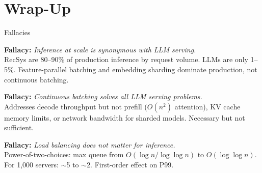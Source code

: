 \documentclass[aspectratio=169, 12pt]{beamer}
\begin{document}
\section{Wrap-Up}

\begin{frame}{Fallacies}

\footnotesize
\textbf{Fallacy:} \textit{Inference at scale is synonymous with LLM serving.}\\
{\scriptsize RecSys are 80--90\% of production inference by request volume. LLMs are only 1--5\%. Feature-parallel batching and embedding sharding dominate production, not continuous batching.}

\vspace{0.08cm}
\textbf{Fallacy:} \textit{Continuous batching solves all LLM serving problems.}\\
{\scriptsize Addresses decode throughput but not prefill ($O(n^2)$ attention), KV cache memory limits, or network bandwidth for sharded models. Necessary but not sufficient.}

\vspace{0.08cm}
\textbf{Fallacy:} \textit{Load balancing does not matter for inference.}\\
{\scriptsize Power-of-two-choices: max queue from $O(\log n / \log \log n)$ to $O(\log \log n)$. For 1,000 servers: $\sim$5 to $\sim$2. First-order effect on P99.}

\end{frame}
\end{document}
